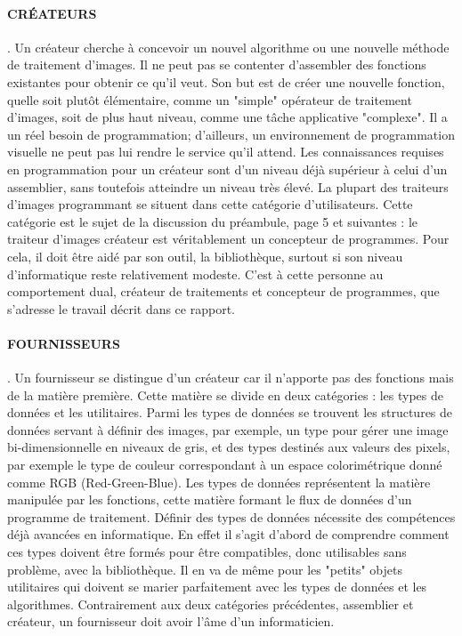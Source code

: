 \paragraph{CRÉATEURS} . Un créateur cherche à concevoir un nouvel algorithme ou une nouvelle méthode
de traitement d'images. Il ne peut pas se contenter d'assembler des fonctions existantes pour obtenir
ce qu'il veut. Son but est de créer une nouvelle fonction, quelle soit plutôt élémentaire, comme un
"simple" opérateur de traitement d'images, soit de plus haut niveau, comme une tâche applicative
"complexe". Il a un réel besoin de programmation; d'ailleurs, un environnement de programmation
visuelle ne peut pas lui rendre le service qu'il attend. Les connaissances requises en programmation
pour un créateur sont d'un niveau déjà supérieur à celui d'un assemblier, sans toutefois atteindre un
niveau très élevé. La plupart des traiteurs d'images programmant se situent dans cette catégorie
d'utilisateurs. Cette catégorie est le sujet de la discussion du préambule, page 5 et suivantes : le
traiteur d'images créateur est véritablement un concepteur de programmes. Pour cela, il doit être
aidé par son outil, la bibliothèque, surtout si son niveau d'informatique reste relativement modeste.
C'est à cette personne au comportement dual, créateur de traitements et concepteur de programmes,
que s'adresse le travail décrit dans ce rapport.
\paragraph{FOURNISSEURS} . Un fournisseur se distingue d'un créateur car il n'apporte pas des fonctions
mais de la matière première. Cette matière se divide en deux catégories : les types de données et les
utilitaires. Parmi les types de données se trouvent les structures de données servant à définir des
images, par exemple, un type pour gérer une image bi-dimensionnelle en niveaux de gris, et des
types destinés aux valeurs des pixels, par exemple le type de couleur correspondant à un espace
colorimétrique donné comme RGB (Red-Green-Blue). Les types de données représentent la matière
manipulée par les fonctions, cette matière formant le flux de données d'un programme de traitement.
Définir des types de données nécessite des compétences déjà avancées en informatique. En effet il
s'agit d'abord de comprendre comment ces types doivent être formés pour être compatibles, donc
utilisables sans problème, avec la bibliothèque. Il en va de même pour les "petits" objets utilitaires
qui doivent se marier parfaitement avec les types de données et les algorithmes. Contrairement
aux deux catégories précédentes, assemblier et créateur, un fournisseur doit avoir l'âme d'un
informaticien.
